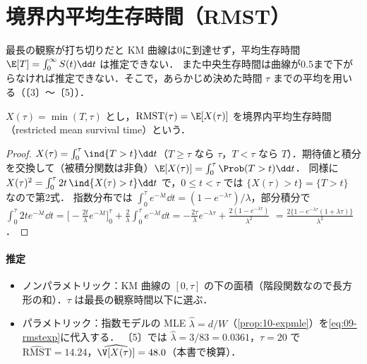 \section{境界内平均生存時間（RMST）}\label{sec:09-rmst}
\Hinshutsu
最長の観察が打ち切りだと KM 曲線は0に到達せず，平均生存時間 $\E[T]=\int_0^\infty S(t)\dd t$ は推定できない．
また中央生存時間は曲線が0.5まで下がらなければ推定できない．そこで，あらかじめ決めた時間 $\tau$ までの平均を用いる（〔3〕〜〔5〕）．
\begin{teigi}[境界内平均生存時間]\label{def:09-rmst}
$X(\tau)=\min(T,\tau)$ とし，$\mathrm{RMST}(\tau)=\E[X(\tau)]$ を境界内平均生存時間（restricted mean survival time）という．
\end{teigi}
\begin{proof}
$X(\tau)=\int_0^\tau\ind\{T>t\}\dd t$（$T\ge\tau$ なら $\tau$，$T<\tau$ なら $T$）．期待値と積分を交換して（被積分関数は非負）$\E[X(\tau)]=\int_0^\tau\Prob(T>t)\dd t$．
同様に $X(\tau)^2=\int_0^\tau2t\,\ind\{X(\tau)>t\}\dd t$ で，$0\le t<\tau$ では $\{X(\tau)>t\}=\{T>t\}$ なので第2式．
指数分布では $\int_0^\tau e^{-\lambda t}\dd t=(1-e^{-\lambda\tau})/\lambda$，部分積分で
$\int_0^\tau2te^{-\lambda t}\dd t=\bigl[-\frac{2t}{\lambda}e^{-\lambda t}\bigr]_0^\tau+\frac2\lambda\int_0^\tau e^{-\lambda t}\dd t=-\frac{2\tau}{\lambda}e^{-\lambda\tau}+\frac{2(1-e^{-\lambda\tau})}{\lambda^2}$
$=\frac{2\{1-e^{-\lambda\tau}(1+\lambda\tau)\}}{\lambda^2}$．
\end{proof}
\paragraph{推定}
\begin{itemize}
\item ノンパラメトリック：KM 曲線の $[0,\tau]$ の下の面積（階段関数なので長方形の和）．$\tau$ は最長の観察時間以下に選ぶ．
\item パラメトリック：指数モデルの MLE $\hat\lambda=d/W$（\cref{prop:10-expmle}）を\cref{eq:09-rmstexp}に代入する．
      〔5〕では $\hat\lambda=3/83=0.0361$，$\tau=20$ で $\widehat{\mathrm{RMST}}=14.24$，$\widehat\V[X(\tau)]=48.0$（本書で検算）．
\end{itemize}
